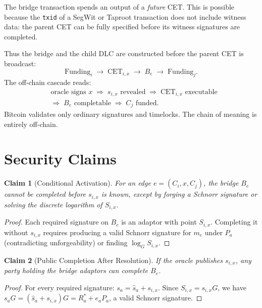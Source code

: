 \documentclass[11pt,a4paper]{article}
\newcommand{\code}[1]{\texttt{#1}}
\theoremstyle{claimstyle}
\newtheorem{claim}{Claim}[section]
\begin{document}
The bridge transaction spends an output of a \emph{future} CET. This is
possible because the \code{txid} of a SegWit or Taproot transaction does not
include witness data: the parent CET can be fully specified before its witness
signatures are completed.

Thus the bridge and the child DLC are constructed before the parent CET is
broadcast:
\[
  \mathrm{Funding}_i \;\to\; \mathrm{CET}_{i,x} \;\to\; B_e \;\to\; \mathrm{Funding}_j.
\]
The off-chain cascade reads:
\begin{align*}
  &\text{oracle signs } x
  \;\Rightarrow\; s_{i,x} \text{ revealed}
  \;\Rightarrow\; \mathrm{CET}_{i,x} \text{ executable}\\
  &\Rightarrow\; B_e \text{ completable}
  \;\Rightarrow\; C_j \text{ funded.}
\end{align*}
Bitcoin validates only ordinary signatures and timelocks. The chain of meaning
is entirely off-chain.

\section{Security Claims}

\begin{claim}[Conditional Activation]
For an edge $e = (C_i, x, C_j)$, the bridge $B_e$ cannot be completed before
$s_{i,x}$ is known, except by forging a Schnorr signature or solving the
discrete logarithm of $S_{i,x}$.
\end{claim}
\begin{proof}
Each required signature on $B_e$ is an adaptor with point $S_{i,x}$.
Completing it without $s_{i,x}$ requires producing a valid Schnorr signature
for $m_e$ under $P_a$ (contradicting unforgeability) or finding $\log_G
S_{i,x}$.
\end{proof}

\begin{claim}[Public Completion After Resolution]
If the oracle publishes $s_{i,x}$, any party holding the bridge adaptors can
complete $B_e$.
\end{claim}
\begin{proof}
For every required signature: $s_a = \hat{s}_a + s_{i,x}$. Since $S_{i,x} =
s_{i,x}G$, we have $s_a G = (\hat{s}_a + s_{i,x})G = R^*_a + e_a P_a$, a valid
Schnorr signature.
\end{proof}
\end{document}
